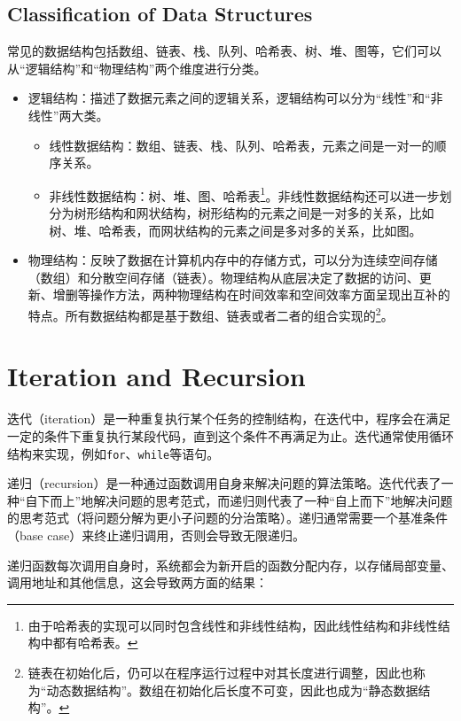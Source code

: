 \subsection{Classification of Data Structures}
常见的数据结构包括数组、链表、栈、队列、哈希表、树、堆、图等，它们可以从“逻辑结构”和“物理结构”两个维度进行分类。

\begin{itemize}
    \item 逻辑结构：描述了数据元素之间的逻辑关系，逻辑结构可以分为“线性”和“非线性”两大类。
        \begin{itemize}
            \item 线性数据结构：数组、链表、栈、队列、哈希表，元素之间是一对一的顺序关系。
            \item 非线性数据结构：树、堆、图、哈希表\footnote{由于哈希表的实现可以同时包含线性和非线性结构，因此线性结构和非线性结构中都有哈希表。}。非线性数据结构还可以进一步划分为树形结构和网状结构，树形结构的元素之间是一对多的关系，比如树、堆、哈希表，而网状结构的元素之间是多对多的关系，比如图。
        \end{itemize}
    \item 物理结构：反映了数据在计算机内存中的存储方式，可以分为连续空间存储（数组）和分散空间存储（链表）。物理结构从底层决定了数据的访问、更新、增删等操作方法，两种物理结构在时间效率和空间效率方面呈现出互补的特点。所有数据结构都是基于数组、链表或者二者的组合实现的\footnote{链表在初始化后，仍可以在程序运行过程中对其长度进行调整，因此也称为“动态数据结构”。数组在初始化后长度不可变，因此也成为“静态数据结构”。}。
\end{itemize}

\section{Iteration and Recursion}
迭代（iteration）是一种重复执行某个任务的控制结构，在迭代中，程序会在满足一定的条件下重复执行某段代码，直到这个条件不再满足为止。迭代通常使用循环结构来实现，例如\texttt{for}、\texttt{while}等语句。

递归（recursion）是一种通过函数调用自身来解决问题的算法策略。迭代代表了一种“自下而上”地解决问题的思考范式，而递归则代表了一种“自上而下”地解决问题的思考范式（将问题分解为更小子问题的分治策略）。递归通常需要一个基准条件（base case）来终止递归调用，否则会导致无限递归。

递归函数每次调用自身时，系统都会为新开启的函数分配内存，以存储局部变量、调用地址和其他信息，这会导致两方面的结果：


